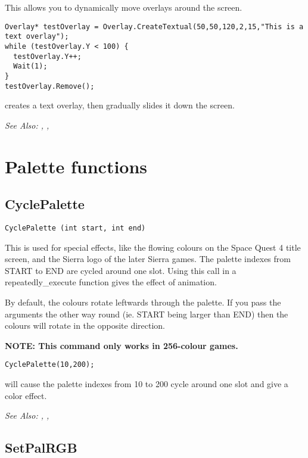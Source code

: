 This allows you to dynamically move overlays around the screen.

\begin{verbatim}
Overlay* testOverlay = Overlay.CreateTextual(50,50,120,2,15,"This is a text overlay");
while (testOverlay.Y < 100) {
  testOverlay.Y++;
  Wait(1);
}
testOverlay.Remove();
\end{verbatim}
creates a text overlay, then gradually slides it down the screen.

\it{See Also:} ,
, 


\section{Palette functions}%

\subsection{CyclePalette}\label{CyclePalette}%

\begin{verbatim}
CyclePalette (int start, int end)
\end{verbatim}
This is used for special effects, like the flowing colours on the Space
Quest 4 title screen, and the Sierra logo of the later Sierra games.
The palette indexes from START to END are cycled around one slot. Using
this call in a repeatedly_execute function gives the effect of animation.

By default, the colours rotate leftwards through the palette. If you pass
the arguments the other way round (ie. START being larger than END) then
the colours will rotate in the opposite direction.

\bf{NOTE:} This command only works in 256-colour games.

\begin{verbatim}
CyclePalette(10,200);
\end{verbatim}
will cause the palette indexes from 10 to 200 cycle around one slot and give a color effect.

\it{See Also:} , , 


\subsection{SetPalRGB}\label{SetPalRGB}%

